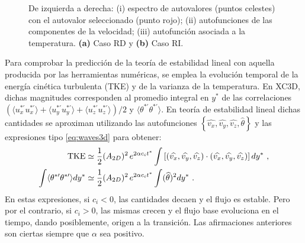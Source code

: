 \begin{figure}[H]
 \centering 
      
 \caption{De izquierda a derecha: (i) espectro de autovalores (puntos celestes) con el autovalor seleccionado (punto rojo); (ii) autofunciones de las componentes de la velocidad; (iii) autofunción asociada a la temperatura. \textbf{(a)} Caso RD y \textbf{(b)} Caso RI.} 
 \label{fig:Ra65-2d}
\end{figure}



Para comprobar la predicción de la teoría de estabilidad lineal con aquella producida por las herramientas numéricas, se emplea la evolución temporal de la energía cinética turbulenta (TKE) y de la varianza de la temperatura. En XC3D, dichas magnitudes corresponden al promedio integral en $y^*$ de las correlaciones $( \langle u^{* \prime}_x u^{* \prime}_x \rangle + \langle u^{* \prime}_y u^{* \prime}_y  \rangle + \langle u^{* \prime}_z u^{* \prime}_z  \rangle) / 2$ y $\langle \theta^{* \prime} \theta^{* \prime} \rangle$. En teoría de estabilidad lineal dichas cantidades se aproximan utilizando las autofunciones $\left\lbrace \widehat{v_x}, \widehat{v_y}, \widehat{v_z}, \widehat{\theta} \right\rbrace$ y las expresiones tipo \ref{eq:waves3d} para obtener:
\begin{align}
\text{TKE} &\simeq \frac{1}{2} (A_{2D})^2 \hspace*{0.5mm} e^{2 \alpha c_i t^*} \int \left[  ( \widehat{v_x}, \widehat{v_y}, \widehat{v_z} ) \cdot ( \widehat{v_x}, \widehat{v_y}, \widehat{v_z} )  \right] dy^* \text{ ,} \\
\int \langle \theta^{* \prime} \theta^{* \prime} \rangle dy^* &\simeq \frac{1}{2} (A_{2D})^2 \hspace*{0.5mm} e^{2 \alpha c_i t^*} \int (\widehat{\theta})^2 dy^* \text{ .}
\end{align}   
En estas expresiones, si $c_i < 0$, las cantidades decaen y el flujo es estable. Pero por el contrario, si $c_i > 0$, las mismas crecen y el flujo base evoluciona en el tiempo, dando posiblemente, origen a la transición. Las afirmaciones anteriores son ciertas siempre que $\alpha$ sea positivo.

